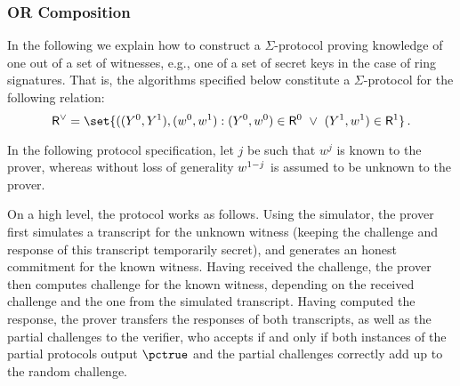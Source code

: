 \documentclass[runningheads,11pt]{article}
\begin{document}
\subsubsection{OR Composition}
  In the following we explain how to construct a $\Sigma$-protocol proving knowledge of one out of a set of witnesses, e.g., one of a set of secret keys in the case of ring signatures.
  That is, the algorithms specified below constitute a $\Sigma$-protocol for the following relation:
\[
  \relation^\lor = \set{
    ((\statement^0,\statement^1),(\witness^0,\witness^1) :
    (\statement^0,\witness^0)\in \relation^0 ~\lor~ (\statement^1,\witness^1)\in\relation^1}\,.
\]

  In the following protocol specification, let $j$ be such that $w^j$ is known to the prover, whereas without loss of generality $w^{1-j}$ is assumed to be unknown to the prover.

	On a high level, the protocol works as follows.
	Using the simulator, the prover first simulates a transcript for the unknown witness (keeping the challenge and response of this transcript temporarily secret), and generates an honest commitment for the known witness.
	Having received the challenge, the prover then computes challenge for the known witness, depending on the received challenge and the one from the simulated transcript.
	Having computed the response, the prover transfers the responses of both transcripts, as well as the partial challenges to the verifier, who accepts if and only if both instances of the partial protocols output $\accept$ and the partial challenges correctly add up to the random challenge.
\end{document}
